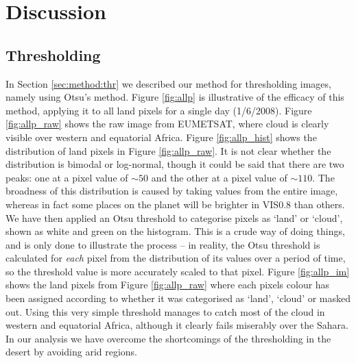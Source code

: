 

\section{Discussion}
\label{sec:disc}
\subsection{Thresholding}
\label{sec:disc:thresh}
In Section \ref{sec:method:thr} we described our method for
thresholding images, namely using Otsu's method. Figure \ref{fig:allp}
is illustrative of the efficacy of this method, applying it to all
land pixels for a single day (1/6/2008). Figure \ref{fig:allp_raw}
shows the raw image from EUMETSAT, where cloud is clearly visible over
western and equatorial Africa. Figure \ref{fig:allp_hist} shows the
distribution of land pixels in Figure \ref{fig:allp_raw}. It is not
clear whether the distribution is bimodal or log-normal, though it
could be said that there are two peaks: one at a pixel value of $\sim50$
and the other at a pixel value of $\sim110$. The broadness of this
distribution is caused by taking values from the entire image, whereas
in fact some places on the planet will be brighter in VIS0.8 than
others. We have then applied an Otsu threshold to categorise pixels as
`land' or `cloud', shown as white and green on the histogram. This is
a crude way of doing things, and is only done to illustrate the
process -- in reality, the Otsu threshold is calculated for \emph{each}
pixel from the distribution of its values over a period of time, so
the threshold value is more accurately scaled to that pixel. Figure
\ref{fig:allp_im} shows the land pixels from Figure \ref{fig:allp_raw}
where each pixels colour has been assigned according to whether it was
categorised as `land', `cloud' or masked out. Using this very simple
threshold manages to catch most of the cloud in western and equatorial
Africa, although it clearly fails miserably over the Sahara. In our
analysis we have overcome the shortcomings of the thresholding in the
desert by avoiding arid regions.
